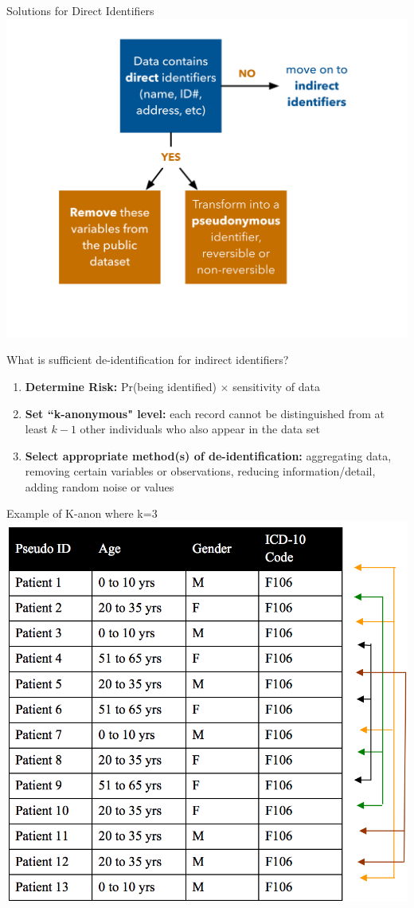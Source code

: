 \documentclass[12pt, compress, handout]{beamer}
\let\noteitem\item %
\renewcommand{\item}{ 
	\noteitem\vspace{\fill}
	}
\begin{document}
	\begin{frame}{Solutions for Direct Identifiers}
		 \centering \includegraphics[width=.9\textwidth]{de-identification_direct.png}
	\end{frame}
	
	\begin{frame}{What is sufficient de-identification for indirect identifiers?}
	
		\begin{enumerate}
			\item \textbf{Determine Risk:} Pr(being identified) $\times$ sensitivity of data
			\item \textbf{Set ``k-anonymous" level:} each record cannot be distinguished from at least $k-1$ other individuals who also appear in the data set
			\item \textbf{Select appropriate method(s) of de-identification:} aggregating data, removing certain variables or observations, reducing information/detail, adding random noise or values 
		\end{enumerate}
	\end{frame}
	
	\begin{frame}{Example of K-anon where k=3}
			 \centering \includegraphics[width=.6\textwidth]{images/k-3.png}
	\end{frame}
	
\end{document}
